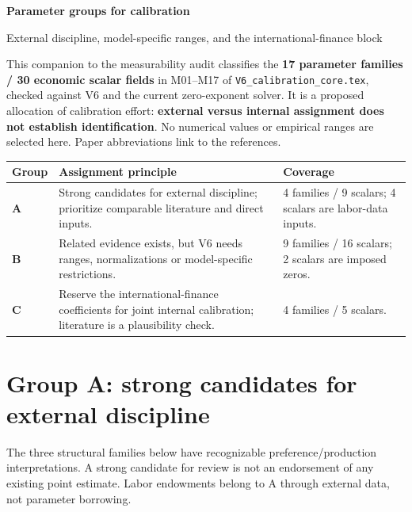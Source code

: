 \documentclass[10pt,a4paper,landscape]{article}
\newcommand{\code}[1]{{\footnotesize\texttt{#1}}}
\begin{document}
{\LARGE\sffamily\bfseries\color{heading}Parameter groups for calibration}\par
{\large\sffamily External discipline, model-specific ranges, and the international-finance block}\par

This companion to the measurability audit classifies the \textbf{17 parameter families / 30 economic scalar fields} in M01--M17 of \code{V6\_calibration\_core.tex}, checked against V6 and the current zero-exponent solver. It is a proposed allocation of calibration effort: \textbf{external versus internal assignment does not establish identification}. No numerical values or empirical ranges are selected here. Paper abbreviations link to the references.

\begin{center}\small
\begin{tabular}{@{}P{.09\textwidth}P{.56\textwidth}P{.27\textwidth}@{}}
\toprule{}\textbf{Group} & \textbf{Assignment principle} & \textbf{Coverage}\\\midrule
\textbf{A} & Strong candidates for external discipline; prioritize comparable literature and direct inputs. & 4 families / 9 scalars; 4 scalars are labor-data inputs.\\[3pt]
\textbf{B} & Related evidence exists, but V6 needs ranges, normalizations or model-specific restrictions. & 9 families / 16 scalars; 2 scalars are imposed zeros.\\[3pt]
\textbf{C} & Reserve the international-finance coefficients for joint internal calibration; literature is a plausibility check. & 4 families / 5 scalars.\\
\bottomrule
\end{tabular}
\end{center}

\section{Group A: strong candidates for external discipline}
The three structural families below have recognizable preference/production interpretations. A strong candidate for review is not an endorsement of any existing point estimate. Labor endowments belong to A through external data, not parameter borrowing.
\end{document}
